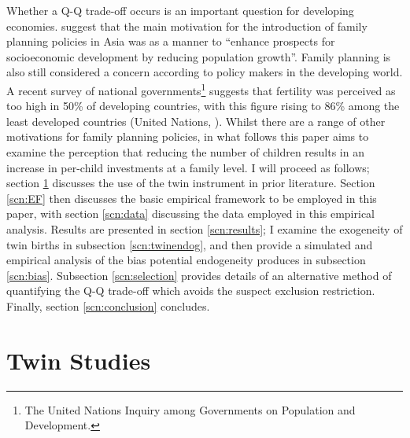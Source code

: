 \documentclass{article}[11pt,subeqn]
\begin{document}
\begin{spacing}{1.5}
Whether a Q-Q trade-off occurs is an important question for developing economies.  \citet{Clelandetal2006} suggest that the main motivation for the introduction of family 
planning policies in Asia was as a manner to ``enhance prospects for socioeconomic development by reducing population growth''.  Family planning is also still considered a 
concern according to policy makers in the developing world.  A recent survey of national governments\footnote{The United Nations Inquiry among Governments on Population and 
Development.} suggests that fertility was perceived as too high in 50\% of developing countries, with this figure rising to 86\% among the least developed countries (United 
Nations, \citeyear{UN2010}).   Whilst there are a range of other motivations for family planning policies, in what follows this paper aims to examine the perception that 
reducing the number of children results in an increase in per-child investments at a family level.  I will proceed as follows; section \ref{scn:lit} discusses the use of 
the twin instrument in prior literature.  Section \ref{scn:EF} then discusses the basic empirical framework to be employed in this paper, with section \ref{scn:data} discussing 
the data employed in this empirical analysis.  Results are presented in section \ref{scn:results}; I examine the exogeneity of twin births in subsection \ref{scn:twinendog}, 
and then provide a simulated and empirical analysis of the bias potential endogeneity produces in subsection \ref{scn:bias}. Subsection \ref{scn:selection} provides details of an 
alternative method of quantifying the Q-Q trade-off which avoids the suspect exclusion restriction.  Finally, section \ref{scn:conclusion} concludes. 

\section{Twin Studies}
\label{scn:lit}





\end{spacing}
\end{document}
